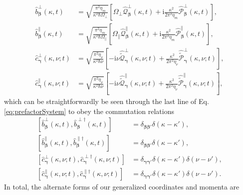 \documentclass{article}
\begin{document}
\begin{equation}
\begin{split}
\hat{b}_{\bm{\beta}}^\perp(\kappa,t) &= \sqrt{\frac{\pi^2\eta_m}{\kappa^2\hbar\Omega_\perp}}\left[\Omega_\perp\hat{\mathcal{Q}}_{\bm{\beta}}^\perp(\kappa,t) + \mathrm{i}\frac{\kappa^2}{2\pi^2\eta_m}\hat{\mathcal{P}}_{\bm{\beta}}^\perp(\kappa,t)\right],\\
\hat{b}_{\bm{\beta}}^\parallel(\kappa,t) &= \sqrt{\frac{\pi^2 \eta_m}{\kappa^2\hbar\Omega_\parallel}}\left[\Omega_\parallel\hat{\mathcal{Q}}_{\bm{\beta}}^\parallel(\kappa,t) + \mathrm{i}\frac{\kappa^2}{2\pi^2\eta_m}\hat{\mathcal{P}}_{\bm{\beta}}^\parallel(\kappa,t)\right],\\
\hat{c}_{\bm{\gamma}}^\perp(\kappa,\nu;t) &= \sqrt{\frac{\pi^2\eta_\nu}{\kappa^2\hbar\nu}}\left[-\mathrm{i}\nu\hat{\tilde{\mathcal{Q}}}_{\bm{\gamma}}^\perp(\kappa,\nu;t) + \frac{\kappa^2}{2\pi^2\eta_\nu}\hat{\tilde{\mathcal{P}}}_{\bm{\gamma}}^\perp(\kappa,\nu;t)\right],\\
\hat{c}_{\bm{\gamma}}^\parallel(\kappa,\nu;t) &= \sqrt{\frac{\pi^2\eta_\nu}{\kappa^2\hbar\nu}}\left[-\mathrm{i}\nu\hat{\tilde{\mathcal{Q}}}_{\bm{\gamma}}^\parallel(\kappa,\nu;t) + \frac{\kappa^2}{2\pi^2 \eta_\nu}\hat{\tilde{\mathcal{P}}}_{\bm{\gamma}}^\parallel(\kappa,\nu;t)\right],
\end{split}
\end{equation}
which can be straightforwardly be seen through the last line of Eq. \eqref{eq:prefactorSystem} to obey the commutation relations
\begin{equation}
\begin{split}
\left[\hat{b}_{\bm{\beta}}^\perp(\kappa,t),\hat{b}_{\bm{\beta}}^{\perp\dagger}(\kappa,t)\right] &= \delta_{\bm{\beta}\bm{\beta}'}\delta(\kappa - \kappa'),\\
\left[\hat{b}_{\bm{\beta}}^\parallel(\kappa,t),\hat{b}_{\bm{\beta}}^{\parallel\dagger}(\kappa,t)\right] &= \delta_{\bm{\beta}\bm{\beta}'}\delta(\kappa - \kappa'),\\
\left[\hat{c}_{\bm{\gamma}}^\perp(\kappa,\nu;t),\hat{c}_{\bm{\gamma}}^{\perp\dagger}(\kappa,\nu;t)\right] &= \delta_{\bm{\gamma}\bm{\gamma}'}\delta(\kappa - \kappa')\delta(\nu - \nu'),\\
\left[\hat{c}_{\bm{\gamma}}^\parallel(\kappa,\nu;t),\hat{c}_{\bm{\gamma}}^{\parallel\dagger}(\kappa,\nu;t)\right] &= \delta_{\bm{\gamma}\bm{\gamma}'}\delta(\kappa - \kappa')\delta(\nu - \nu').
\end{split}
\end{equation}
In total, the alternate forms of our generalized coordinates and momenta are
\end{document}
